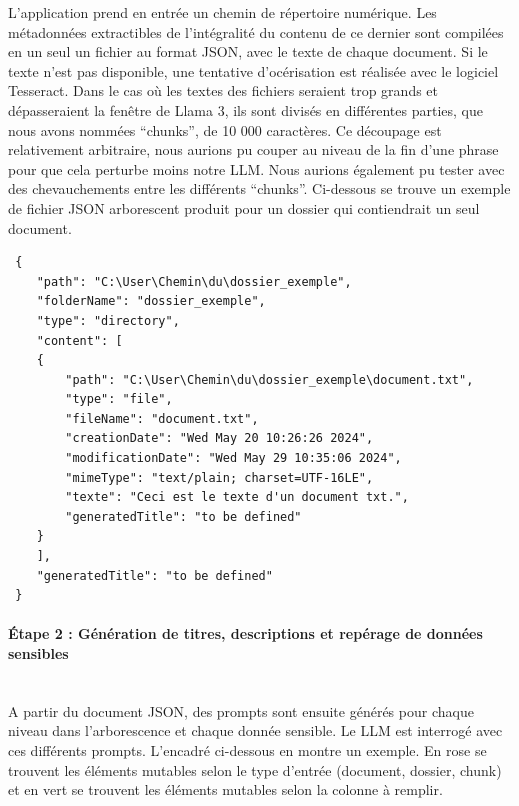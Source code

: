 L'application prend en entrée un chemin de répertoire numérique.
Les métadonnées extractibles de l'intégralité du contenu de ce dernier sont compilées en un seul un fichier au format JSON, 
avec le texte de chaque document. Si le texte n'est pas disponible, une tentative d'océrisation est réalisée avec le logiciel Tesseract.
Dans le cas où les textes des fichiers seraient trop grands et dépasseraient la \gls{fenêtre} de Llama 3, ils sont divisés en différentes parties,
 que nous avons nommées \enquote{chunks}, de 10 000 caractères. Ce découpage est relativement arbitraire, nous aurions pu couper 
 au niveau de la fin d'une phrase pour que cela perturbe moins notre LLM.
 Nous aurions également pu tester avec des chevauchements entre les différents \enquote{chunks}.
 Ci-dessous se trouve un exemple de fichier JSON arborescent produit pour un dossier qui contiendrait un seul document.
 \vspace*{0.2cm}
\begin{tcolorbox}[colback=white, colbacktitle=white, coltitle=black, title=Exemple de fichier JSON arborescent pour un dossier contenant un document, center title]
  \begin{verbatim}
 {
    "path": "C:\User\Chemin\du\dossier_exemple",
    "folderName": "dossier_exemple",
    "type": "directory",
    "content": [
    {
        "path": "C:\User\Chemin\du\dossier_exemple\document.txt",
        "type": "file",
        "fileName": "document.txt",
        "creationDate": "Wed May 20 10:26:26 2024",
        "modificationDate": "Wed May 29 10:35:06 2024",
        "mimeType": "text/plain; charset=UTF-16LE",
        "texte": "Ceci est le texte d'un document txt.",
        "generatedTitle": "to be defined"
    }
    ],
    "generatedTitle": "to be defined"
 }
\end{verbatim}
\end{tcolorbox}



\paragraph*{Étape 2 : Génération de titres, descriptions et repérage de données sensibles}\mbox{}\\

A partir du document JSON, des \gls{prompt}s sont ensuite générés pour chaque niveau dans l'arborescence et chaque donnée sensible.
Le LLM est interrogé avec ces différents prompts.
L'encadré ci-dessous en montre un exemple.
En rose se trouvent les éléments mutables selon le type d'entrée (document, dossier, chunk) 
et en vert se trouvent les éléments mutables selon la colonne à remplir.

